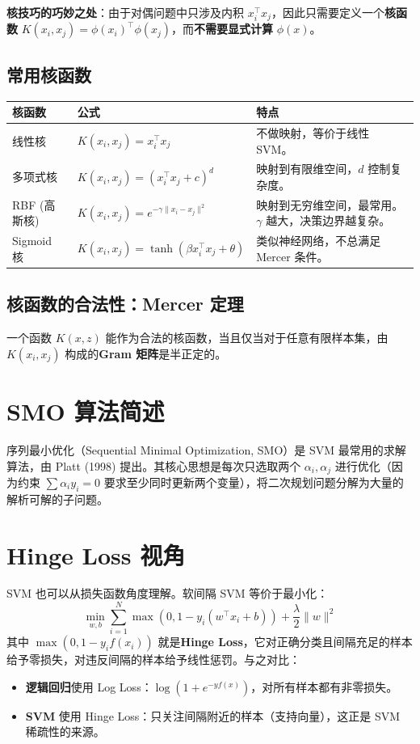 \documentclass[12pt, a4paper]{article}
\begin{document}
\textbf{核技巧的巧妙之处}：由于对偶问题中只涉及内积 $x_i^\top x_j$，因此只需要定义一个\textbf{核函数} $K(x_i, x_j) = \phi(x_i)^\top \phi(x_j)$，而\textbf{不需要显式计算} $\phi(x)$。

\subsection{常用核函数}
\begin{table}[h]
\centering
\begin{tabularx}{\textwidth}{|l|l|X|}
\hline
\textbf{核函数} & \textbf{公式} & \textbf{特点} \\
\hline
线性核 & $K(x_i, x_j) = x_i^\top x_j$ & 不做映射，等价于线性 SVM。 \\
\hline
多项式核 & $K(x_i, x_j) = (x_i^\top x_j + c)^d$ & 映射到有限维空间，$d$ 控制复杂度。 \\
\hline
RBF (高斯核) & $K(x_i, x_j) = e^{-\gamma \|x_i - x_j\|^2}$ & 映射到无穷维空间，最常用。$\gamma$ 越大，决策边界越复杂。 \\
\hline
Sigmoid 核 & $K(x_i, x_j) = \tanh(\beta x_i^\top x_j + \theta)$ & 类似神经网络，不总满足 Mercer 条件。 \\
\hline
\end{tabularx}
\end{table}

\subsection{核函数的合法性：Mercer 定理}
一个函数 $K(x, z)$ 能作为合法的核函数，当且仅当对于任意有限样本集，由 $K(x_i, x_j)$ 构成的\textbf{Gram 矩阵}是半正定的。

\section{SMO 算法简述}
序列最小优化（Sequential Minimal Optimization, SMO）是 SVM 最常用的求解算法，由 Platt (1998) 提出。其核心思想是每次只选取两个 $\alpha_i, \alpha_j$ 进行优化（因为约束 $\sum \alpha_i y_i = 0$ 要求至少同时更新两个变量），将二次规划问题分解为大量的解析可解的子问题。

\section{Hinge Loss 视角}
SVM 也可以从损失函数角度理解。软间隔 SVM 等价于最小化：
$$ \min_{w, b} \sum_{i=1}^N \max(0, 1 - y_i(w^\top x_i + b)) + \frac{\lambda}{2} \|w\|^2 $$
其中 $\max(0, 1 - y_i f(x_i))$ 就是\textbf{Hinge Loss}，它对正确分类且间隔充足的样本给予零损失，对违反间隔的样本给予线性惩罚。与之对比：
\begin{itemize}
    \item \textbf{逻辑回归}使用 Log Loss：$\log(1 + e^{-yf(x)})$，对所有样本都有非零损失。
    \item \textbf{SVM} 使用 Hinge Loss：只关注间隔附近的样本（支持向量），这正是 SVM 稀疏性的来源。
\end{itemize}
\end{document}
